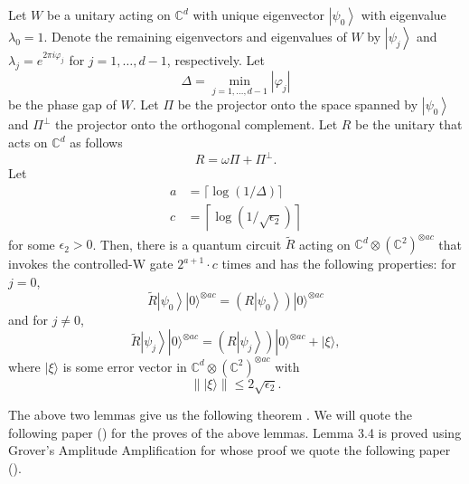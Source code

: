 \begin{lemma}
	 Let $W$ be a unitary acting on $\mathbb{C}^d$ with unique eigenvector $\left|\psi_0\right\rangle$ with eigenvalue $\lambda_0=1$. Denote the remaining eigenvectors and eigenvalues of $W$ by $\left|\psi_j\right\rangle$ and $\lambda_j=e^{2 \pi i \varphi_j}$ for $j=1, \ldots, d-1$, respectively. Let
	$$
	\Delta=\min _{j=1, \ldots, d-1}\left|\varphi_j\right|
	$$
	be the phase gap of $W$. Let $\Pi$ be the projector onto the space spanned by $\left|\psi_0\right\rangle$ and $\Pi^{\perp}$ the projector onto the orthogonal complement. Let $R$ be the unitary that acts on $\mathbb{C}^d$ as follows
	$$
	R=\omega \Pi+\Pi^{\perp} .
	$$
	Let
	$$
	\begin{aligned}
		a & =\lceil\log (1 / \Delta)\rceil \\
		c & =\left\lceil\log \left(1 / \sqrt{\epsilon_2}\right)\right\rceil
	\end{aligned}
	$$
	for some $\epsilon_2>0$. Then, there is a quantum circuit $\tilde{R}$ acting on $\mathbb{C}^d \otimes\left(\mathbb{C}^2\right)^{\otimes a c}$ that invokes the controlled-W gate $2^{a+1} \cdot c$ times and has the following properties: for $j=0$,
	$$
	\tilde{R}\left|\psi_0\right\rangle|0\rangle^{\otimes a c}=\left(R\left|\psi_0\right\rangle\right)|0\rangle^{\otimes a c}
	$$
	and for $j \neq 0$,
	$$
	\tilde{R}\left|\psi_j\right\rangle|0\rangle^{\otimes a c}=\left(R\left|\psi_j\right\rangle\right)|0\rangle^{\otimes a c}+|\xi\rangle,
	$$
	where $|\xi\rangle$ is some error vector in $\mathbb{C}^d \otimes\left(\mathbb{C}^2\right)^{\otimes a c}$ with
	$$
	\||\xi\rangle \| \leq 2 \sqrt{\epsilon_2} .
	$$
\end{lemma}
\break
The above two lemmas give us the following theorem . We will quote the following paper () for the proves of the above lemmas. Lemma 3.4 is proved using Grover's Amplitude Amplification for whose proof we quote the following paper ().
